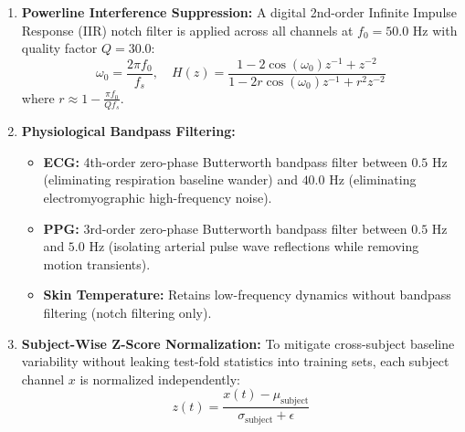 \documentclass[conference]{IEEEtran}
\begin{document}
\begin{enumerate}
    \item \textbf{Powerline Interference Suppression:}
    A digital 2nd-order Infinite Impulse Response (IIR) notch filter is applied across all channels at $f_0 = 50.0\text{ Hz}$ with quality factor $Q = 30.0$:
    \begin{equation}
    \omega_0 = \frac{2\pi f_0}{f_s}, \quad H(z) = \frac{1 - 2\cos(\omega_0)z^{-1} + z^{-2}}{1 - 2r\cos(\omega_0)z^{-1} + r^2 z^{-2}}
    \end{equation}
    where $r \approx 1 - \frac{\pi f_0}{Q f_s}$.

    \item \textbf{Physiological Bandpass Filtering:}
    \begin{itemize}
        \item \textbf{ECG:} 4th-order zero-phase Butterworth bandpass filter between $0.5\text{ Hz}$ (eliminating respiration baseline wander) and $40.0\text{ Hz}$ (eliminating electromyographic high-frequency noise).
        \item \textbf{PPG:} 3rd-order zero-phase Butterworth bandpass filter between $0.5\text{ Hz}$ and $5.0\text{ Hz}$ (isolating arterial pulse wave reflections while removing motion transients).
        \item \textbf{Skin Temperature:} Retains low-frequency dynamics without bandpass filtering (notch filtering only).
    \end{itemize}

    \item \textbf{Subject-Wise Z-Score Normalization:}
    To mitigate cross-subject baseline variability without leaking test-fold statistics into training sets, each subject channel $x$ is normalized independently:
    \begin{equation}
    z(t) = \frac{x(t) - \mu_{\text{subject}}}{\sigma_{\text{subject}} + \epsilon}
    \end{equation}
\end{enumerate}
\end{document}
